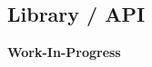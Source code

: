 \documentclass{llncs}
\begin{document}
{			%

		
		\subsection{Library / API}
			\label{ss:library-api}				

			\textbf{Work-In-Progress}
			

}
\end{document}
